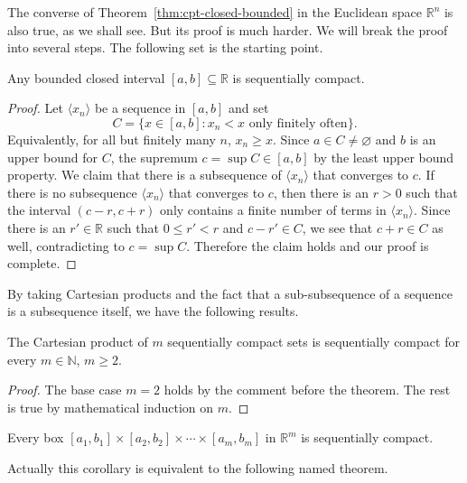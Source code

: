 The converse of Theorem~\ref{thm:cpt-closed-bounded} in the Euclidean space $\mathbb{R}^n$ is also true, as we shall see.
But its proof is much harder.
We will break the proof into several steps.
The following set is the starting point.

\begin{thm}
  \label{thm:bounded-closed-interval-cpt}
  Any bounded closed interval $[a,b] \subseteq \mathbb{R}$ is sequentially compact.
\end{thm}

\begin{proof}
  Let $\langle x_n \rangle$ be a sequence in $[a,b]$ and set
  \[
    C = \{ x \in [a,b] \colon x_n < x \text{ only finitely often} \}.
  \]
  Equivalently, for all but finitely many $n$, $x_n \geqslant x$.
  Since $a \in C \ne \varnothing$ and $b$ is an upper bound for $C$, the supremum $c = \sup C \in [a,b]$ by the least upper bound property.
  We claim that there is a subsequence of $\langle x_n \rangle$ that converges to $c$.
  If there is no subsequence $\langle x_n \rangle$ that converges to $c$, then there is an $r > 0$ such that the interval $(c - r, c + r)$ only contains a finite number of terms in $\langle x_n \rangle$. 
  Since there is an $r' \in \mathbb{R}$ such that $0 \leqslant r' < r$ and $c - r' \in C$, we see that $c + r \in C$ as well, contradicting to $c = \sup C$.
  Therefore the claim holds and our proof is complete.
\end{proof}

By taking Cartesian products and the fact that a sub-subsequence of a sequence is a subsequence itself, we have the following results.

\begin{thm}
  \label{thm:cpt-product}
  The Cartesian product of $m$ sequentially compact sets is sequentially compact for every $m \in \mathbb{N}$, $m \geqslant 2$.
\end{thm}

\begin{proof}
  The base case $m = 2$ holds by the comment before the theorem.
  The rest is true by mathematical induction on $m$.
\end{proof}

\begin{cor}
  Every \textsf{box} $[a_1, b_1] \times [a_2, b_2] \times \cdots \times [a_m, b_m]$ in $\mathbb{R}^m$ is sequentially compact.
\end{cor}

Actually this corollary is equivalent to the following named theorem.

